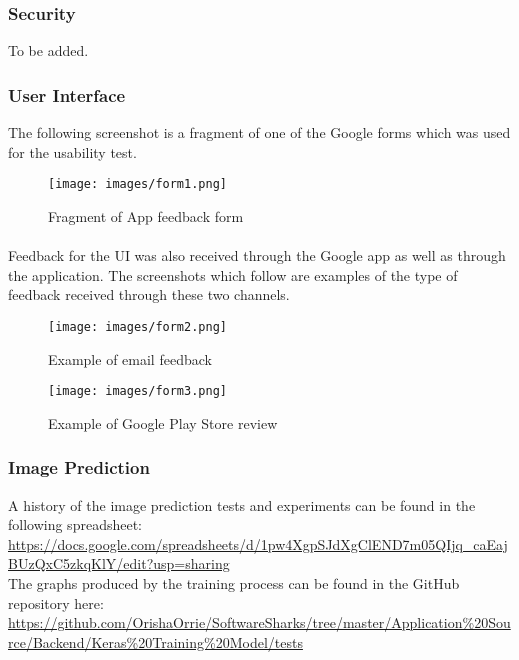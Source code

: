 \documentclass[a4paper, 11pt]{article}
\begin{document}
        \subsubsection{Security}
        To be added.
        
        \subsubsection{User Interface}
        The following screenshot is a fragment of one of the Google forms which was used for the usability test.
        \begin{figure}[H]
            \texttt{[image: images/form1.png]}
            \caption{Fragment of App feedback form}
            \label{fig:form_feedback}
        \end{figure}
        
        \paragraph{}
        Feedback for the UI was also received through the Google app as well as through the application. The screenshots which follow are examples of the type of feedback received through these two channels.
        \begin{figure}[H]
            \texttt{[image: images/form2.png]}
            \caption{Example of email feedback}
            \label{fig:email}
        \end{figure}
        \begin{figure}[H]
            \texttt{[image: images/form3.png]}
            \caption{Example of Google Play Store review}
            \label{fig:gps_review}
        \end{figure}
        
        \subsubsection{Image Prediction}
        A history of the image prediction tests and experiments can be found in the following spreadsheet: \\
        \url{https://docs.google.com/spreadsheets/d/1pw4XgpSJdXgClEND7m05QIjq_caEajBUzQxC5zkqKlY/edit?usp=sharing}\\
        
        The graphs produced by the training process can be found in the GitHub repository here: \url{https://github.com/OrishaOrrie/SoftwareSharks/tree/master/Application\%20Source/Backend/Keras\%20Training\%20Model/tests}
        
\end{document}
